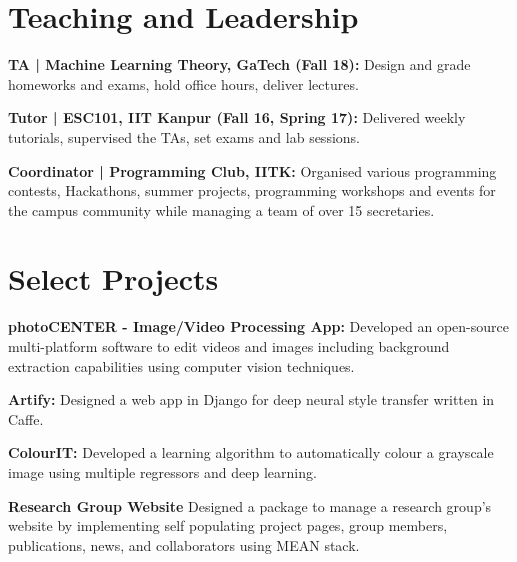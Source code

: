 \documentclass[US paper]{deedy-resume} %
\begin{document}
{\vspace{1mm}

\vspace{-5pt}
\section{Teaching and Leadership}

\vspace{6pt}
\begin{tightitemize}
\item \textbf{TA | Machine Learning Theory, GaTech (Fall 18):} Design and grade homeworks and exams, hold office hours, deliver lectures.\vspace{0.5mm}
\item \textbf{Tutor | ESC101, IIT Kanpur (Fall 16, Spring 17):} Delivered weekly tutorials, supervised the TAs, set exams and lab sessions. \vspace{0.5mm}
\item \textbf{Coordinator | Programming Club, IITK:} Organised various programming contests, Hackathons, summer projects, programming workshops and events for the campus community while managing a team of over 15 secretaries.
\vspace{0.5mm}
\end{tightitemize}
\vspace{-5pt}

\section{Select Projects}

\vspace{5pt}
\begin{tightitemize}
\item \textbf{photoCENTER - Image/Video Processing App:} Developed an open-source multi-platform software to edit videos and images including background extraction capabilities using computer vision techniques. \vspace{0.5mm}
\item \textbf{Artify:} Designed a web app in Django for deep neural style transfer written in Caffe.
\vspace{0.5mm}
\item \textbf{ColourIT:} Developed a learning algorithm to automatically colour a grayscale image using multiple regressors and deep learning. \vspace{0.5mm}
\item \textbf{Research Group Website} Designed a package to manage a research group's website by implementing self populating project pages, group members, publications, news, and collaborators using MEAN stack.
\end{tightitemize}


}
\end{document}
